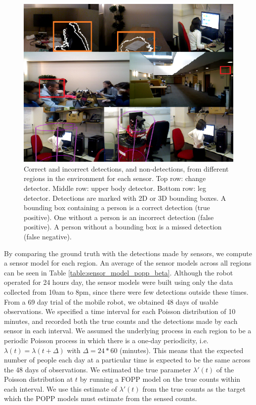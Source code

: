 \begin{figure}[t]
	\centering
	\includegraphics[width=0.8\columnwidth]{./figures/sensor_images.png}
	\caption{Correct and incorrect detections, and non-detections, from different regions in the environment for each sensor. Top row: change detector. Middle row: upper body detector. Bottom row: leg detector. Detections are marked with 2D or 3D bounding boxes. A bounding box containing a person is a correct detection (true positive). One without a person is an incorrect detection (false positive). A person without a bounding box is a missed detection (false negative).}
	\label{fig:single_sensor_rate_transformation}
	\vspace{-25pt}
\end{figure}

By comparing the ground truth with the detections made by sensors, we compute a sensor model for each region. An average of the sensor models across all regions can be seen in Table \ref{table:sensor_model_popp_beta}. Although the robot operated for 24 hours day, the sensor models were built using only the data collected from 10am to 8pm, since there were few detections outside these times. From a 69 day trial of the mobile robot, we obtained 48 days of usable observations. We specified a time interval for each Poisson distribution of 10 minutes, and recorded both the true counts and the detections made by each sensor in each interval. We assumed the underlying process in each region to be a periodic Poisson process in which there is a one-day periodicity, i.e. $\lambda(t) = \lambda(t + \Delta)$ with $\Delta = 24 * 60$ (minutes). This means that the expected number of people each day at a particular time is expected to be the same across the 48 days of observations. We estimated the true parameter $\lambda'(t)$ of the Poisson distribution at $t$ by running a FOPP model on the true counts within each interval. We use this estimate of $\lambda'(t)$ from the true counts as the target which the POPP models must estimate from the sensed counts.

